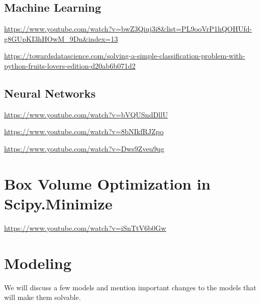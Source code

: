 \subsection{Machine Learning}

\begin{resource}
\url{https://www.youtube.com/watch?v=bwZ3Qiuj3i8&list=PL9ooVrP1hQOHUfd-g8GUpKI3hHOwM_9Dn&index=13}


\url{https://towardsdatascience.com/solving-a-simple-classification-problem-with-python-fruits-lovers-edition-d20ab6b071d2}
\end{resource}
\subsection{Neural Networks}

\begin{resource}
\url{https://www.youtube.com/watch?v=bVQUSndDllU}

\url{https://www.youtube.com/watch?v=8bNIkfRJZpo}

\url{https://www.youtube.com/watch?v=Dws9Zveu9ug}
\end{resource}


\section{Box Volume Optimization in Scipy.Minimize}
\url{https://www.youtube.com/watch?v=iSnTtV6b0Gw}

\section{Modeling}
We will discuss a few models and mention important changes to the models that will make them solvable.  

